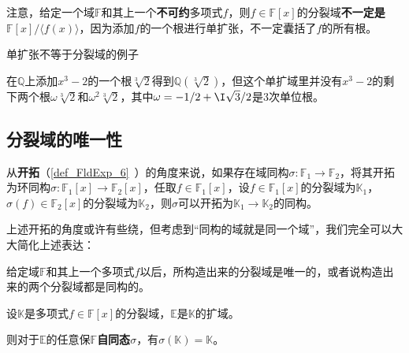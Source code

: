 注意，给定一个域$\mathbb{F}$和其上一个\textbf{不可约}多项式$f$，则$f\in\mathbb{F}[x]$的分裂域\textbf{不一定是}$\mathbb{F}[x]/\langle f(x) \rangle $，因为添加$f$的一个根进行单扩张，不一定囊括了$f$的所有根。




\begin{example}{单扩张不等于分裂域的例子}

在$\mathbb{Q}$上添加$x^3-2$的一个根$\sqrt[3]{2}$得到$\mathbb{Q}(\sqrt[3]{2})$，但这个单扩域里并没有$x^3-2$的剩下两个根$\omega\sqrt[3]{2}$和$\omega^2\sqrt[3]{2}$，其中$\omega=-1/2+\I\sqrt{3}/2$是$3$次单位根。

\end{example}










\subsection{分裂域的唯一性}

从\textbf{开拓}（\autoref{def_FldExp_6}~）的角度来说，如果存在域同构$\sigma:\mathbb{F}_1\to\mathbb{F}_2$，将其开拓为环同构$\sigma:\mathbb{F}_1[x]\to\mathbb{F}_2[x]$，任取$f\in\mathbb{F}_1[x]$，设$f\in\mathbb{F}_1[x]$的分裂域为$\mathbb{K}_1$，$\sigma(f)\in\mathbb{F}_2[x]$的分裂域为$\mathbb{K}_2$，则$\sigma$可以开拓为$\mathbb{K}_1\to\mathbb{K}_2$的同构。

上述开拓的角度或许有些绕，但考虑到“同构的域就是同一个域”，我们完全可以大大简化上述表达：

\begin{theorem}{}
给定域$\mathbb{F}$和其上一个多项式$f$以后，所构造出来的分裂域是唯一的，或者说构造出来的两个分裂域都是同构的。
\end{theorem}










\begin{theorem}{}\label{the_SpltFd_3}
设$\mathbb{K}$是多项式$f\in\mathbb{F}[x]$的分裂域，$\mathbb{E}$是$\mathbb{K}$的扩域。

则对于$\mathbb{E}$的任意保$\mathbb{F}$\textbf{自同态}$\sigma$，有$\sigma(\mathbb{K})=\mathbb{K}$。
\end{theorem}

